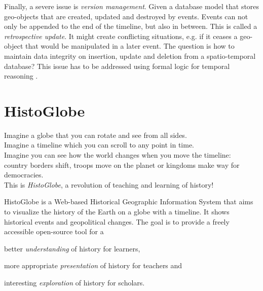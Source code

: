 Finally, a severe issue is \emph{version management}. Given a database model that stores geo-objects that are created, updated and destroyed by events. Events can not only be appended to the end of the timeline, but also in between. This is called a \emph{retrospective update}. It might create conflicting situations, e.g. if it ceases a geo-object that would be manipulated in a later event. The question is how to maintain data integrity on insertion, update and deletion from a spatio-temporal database? This issue has to be addressed using formal logic for temporal reasoning
\cite[section 6]{peuquet99}.




\section{HistoGlobe} %
\label{sec:histoglobe}

\begin{quoteit}
  Imagine a globe that you can rotate and see from all sides. \\
  Imagine a timeline which you can scroll to any point in time. \\
  Imagine you can see how the world changes when you move the timeline: \\
  country borders shift, troops move on the planet or kingdoms make way for democracies. \\[0.5em]
  This is \emph{HistoGlobe}, a revolution of teaching and learning of history!
\end{quoteit}

HistoGlobe is a Web-based Historical Geographic Information System that aims to visualize the history of the Earth on a globe with a timeline. It shows historical events and geopolitical changes. The goal is to provide a freely accessible open-source tool for a

\begin{compactitem}
  \item better \emph{understanding} of history for learners,
  \item more appropriate \emph{presentation} of history for teachers and
  \item interesting \emph{exploration} of history for scholars.
\end{compactitem}

